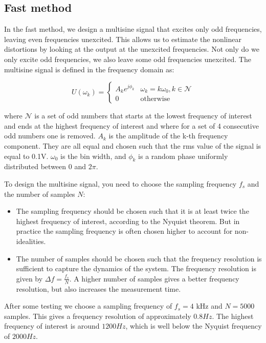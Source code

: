 \subsection{Fast method} \label{sec:fast_method}

In the fast method, we design a multisine signal that excites only odd frequencies, leaving even frequencies unexcited. This allows us to estimate the nonlinear distortions by looking at the output at the unexcited frequencies. Not only do we only excite odd frequencies, we also leave some odd frequencies unexcited.
The multisine signal is defined in the frequency domain as:

\begin{equation}
    U(\omega_k) = \begin{cases}
    A_k e^{j \phi_k} & \omega_k = k \omega_0, k \in \mathcal{N} \\
    0 & \text{otherwise}
\end{cases}
\end{equation}

where $\mathcal{N}$ is a set of odd numbers that starts at the lowest frequency of interest and ends at the highest frequency of interest and where for a set of 4 consecutive odd numbers one is removed. $A_k$ is the amplitude of the k-th frequency component. They are all equal and chosen such that the rms value of the signal is equal to 0.1V. $\omega_0$ is the bin width, and $\phi_k$ is a random phase uniformly distributed between 0 and $2\pi$.


To design the multisine signal, you need to choose the sampling frequency $f_s$ and the number of samples $N$:

\begin{itemize}
    \item The sampling frequency should be chosen such that it is at least twice the highest frequency of interest, according to the Nyquist theorem. But in practice the sampling frequency is often chosen higher to account for non-idealities.
    \item The number of samples should be chosen such that the frequency resolution is sufficient to capture the dynamics of the system. The frequency resolution is given by $\Delta f = \frac{f_s}{N}$. A higher number of samples gives a better frequency resolution, but also increases the measurement time.
\end{itemize}


After some testing we choose a sampling frequency of $f_s = 4$ kHz and $N = 5000$ samples. This gives a frequency resolution of approximately $0.8 Hz$. The highest frequency of interest is around $1200 Hz$, which is well below the Nyquist frequency of $2000 Hz$.

